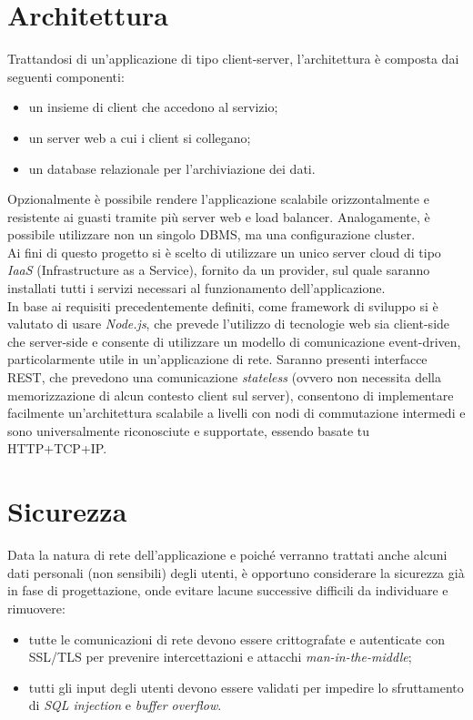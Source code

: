 \documentclass[11pt]{report}
\begin{document}
\section{Architettura}
Trattandosi di un'applicazione di tipo client-server, l'architettura è composta dai seguenti componenti:
\begin{itemize}
	\item un insieme di client che accedono al servizio;
	\item un server web a cui i client si collegano;
	\item un database relazionale per l'archiviazione dei dati.
\end{itemize}
Opzionalmente è possibile rendere l'applicazione scalabile orizzontalmente e resistente ai guasti tramite più server web e load balancer.
Analogamente, è possibile utilizzare non un singolo DBMS, ma una configurazione cluster.
\\Ai fini di questo progetto si è scelto di utilizzare un unico server cloud di tipo \textit{IaaS} (Infrastructure as a Service), fornito da un provider, sul quale saranno installati tutti i servizi necessari al funzionamento dell'applicazione.
\\In base ai requisiti precedentemente definiti, come framework di sviluppo si è valutato di usare \textit{Node.js}, che prevede l'utilizzo di tecnologie web sia client-side che server-side e consente di utilizzare un modello di comunicazione event-driven, particolarmente utile in un'applicazione di rete.
Saranno presenti interfacce REST, che prevedono una comunicazione \textit{stateless} (ovvero non necessita della memorizzazione di alcun contesto client sul server), consentono di implementare facilmente un'architettura scalabile a livelli con nodi di commutazione intermedi e sono universalmente riconosciute e supportate, essendo basate tu HTTP+TCP+IP.

\section{Sicurezza}
Data la natura di rete dell'applicazione e poiché verranno trattati anche alcuni dati personali (non sensibili) degli utenti, è opportuno considerare la sicurezza già in fase di progettazione, onde evitare lacune successive difficili da individuare e rimuovere:
\begin{itemize}
	\item tutte le comunicazioni di rete devono essere crittografate e autenticate con SSL/TLS per prevenire intercettazioni e attacchi \textit{man-in-the-middle};
	\item tutti gli input degli utenti devono essere validati per impedire lo sfruttamento di \textit{SQL injection} e \textit{buffer overflow}.
\end{itemize}
\end{document}
